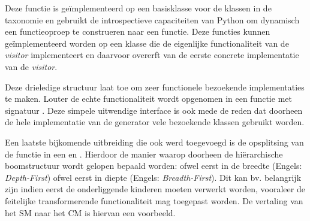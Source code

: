 Deze  functie is ge\"implementeerd op een basisklasse voor de
klassen in de taxonomie en gebruikt de introspectieve capaciteiten van Python
om dynamisch een functieoproep te construeren naar een 
functie. Deze functies kunnen ge\"implementeerd worden op een klasse die de
eigenlijke functionaliteit van de \emph{visitor} implementeert en daarvoor
overerft van de eerste concrete implementatie van de \emph{visitor}.

Deze drieledige structuur laat toe om zeer functionele bezoekende
implementaties te maken. Louter de echte functionaliteit wordt opgenomen in een
functie met signatuur . Deze simpele uitwendige interface
is ook mede de reden dat doorheen de hele implementatie van de generator vele
bezoekende klassen gebruikt worden.

Een laatste bijkomende uitbreiding die ook werd toegevoegd is de opsplitsing
van de  functie in een  en
. Hierdoor de manier waarop doorheen de
hi\"erarchische boomstructuur wordt gelopen bepaald worden: ofwel eerst in de
breedte (Engels: \emph{Depth-First}) ofwel eerst in diepte (Engels:
\emph{Breadth-First}). Dit kan bv. belangrijk zijn indien eerst de
onderliggende kinderen moeten verwerkt worden, vooraleer de feitelijke
transformerende functionaliteit mag toegepast worden. De vertaling van het SM
naar het CM is hiervan een voorbeeld.
